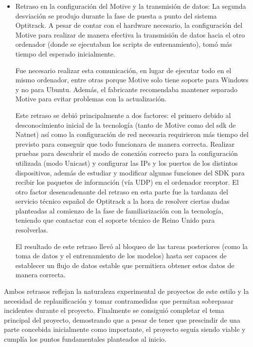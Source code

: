 \begin{itemize}
    \item Retraso en la configuración del Motive y la transmisión de datos:
    La segunda desviación se produjo durante la fase de puesta a punto del sistema Optitrack. A pesar de contar con el hardware necesario, la 
    configuración del Motive para realizar de manera efectiva la transmisión de datos hacia el otro ordenador (donde se ejecutaban los scripts 
    de entrenamiento), tomó más tiempo del esperado inicialmente. 

    Fue necesario realizar esta comunicación, en lugar de ejecutar todo en el mismo ordenador, entre otras porque Motive solo tiene soporte para Windows 
    y no para Ubuntu. Además, el fabricante recomendaba mantener separado Motive para evitar problemas con la actualización.


    Este retraso se debió principalmente a dos factores: el primero debido al desconocimiento inicial de la tecnología (tanto de Motive como 
    del \Gls{sdk} de Natnet) así como la configuración de red necesaria requirieron más tiempo del previsto para conseguir que todo funcionara 
    de manera correcta. Realizar pruebas para descubrir el modo de conexión correcto para la configuración utilizada (modo Unicast) y 
    configurar las IPs y los puertos de los distintos dispositivos, además de estudiar y modificar algunas funciones del SDK para recibir los 
    paquetes de información (vía UDP) en el ordenador receptor.
    El otro factor desencadenante del retraso en esta parte fue la tardanza del servicio técnico español de Optitrack a la hora de resolver 
    ciertas dudas planteadas al comienzo de la fase de familiarización con la tecnología, teniendo que contactar con el soporte técnico de 
    Reino Unido para resolverlas.

    El resultado de este retraso llevó al bloqueo de las tareas posteriores (como la toma de datos y el entrenamiento de los modelos) hasta 
    ser capaces de establecer un flujo de datos estable que permitiera obtener estos datos de manera correcta.


\end{itemize}

Ambos retrasos reflejan la naturaleza experimental de proyectos de este estilo y la necesidad de replanificación y tomar contramedidas que 
permitan sobrepasar incidentes durante el proyecto. Finalmente se consiguió completar el tema principal del proyecto, demostrando que a pesar 
de tener que prescindir de una parte concebida inicialmente como importante, el proyecto seguía siendo viable y cumplía los puntos 
fundamentales planteados al inicio.

